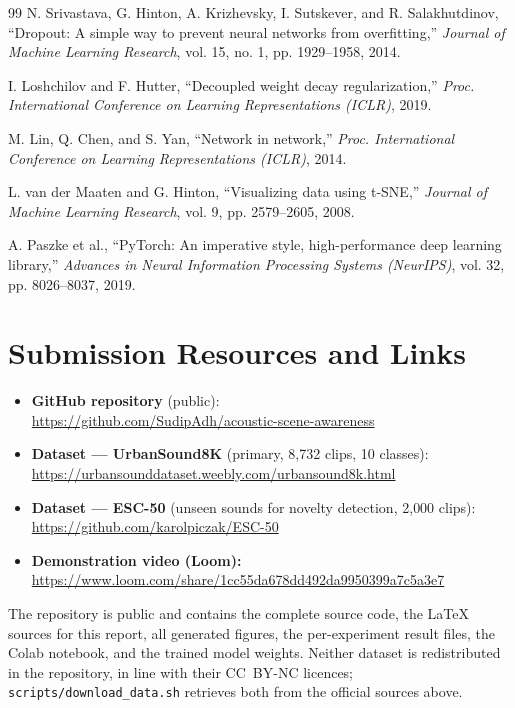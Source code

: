 \documentclass[11pt, a4paper]{article}
\newcommand{\repourl}{https://github.com/SudipAdh/acoustic-scene-awareness}
\newcommand{\youtubeurl}{\url{https://www.loom.com/share/1cc55da678dd492da9950399a7c5a3e7}}
\newcommand{\dsurbanurl}{https://urbansounddataset.weebly.com/urbansound8k.html}
\newcommand{\dsescurl}{https://github.com/karolpiczak/ESC-50}
\begin{document}
\begin{thebibliography}{99}
N. Srivastava, G. Hinton, A. Krizhevsky, I. Sutskever, and R. Salakhutdinov, ``Dropout: A simple way to prevent neural networks from overfitting,'' \emph{Journal of Machine Learning Research}, vol. 15, no. 1, pp. 1929--1958, 2014.

I. Loshchilov and F. Hutter, ``Decoupled weight decay regularization,'' \emph{Proc. International Conference on Learning Representations (ICLR)}, 2019.

M. Lin, Q. Chen, and S. Yan, ``Network in network,'' \emph{Proc. International Conference on Learning Representations (ICLR)}, 2014.

L. van der Maaten and G. Hinton, ``Visualizing data using t-SNE,'' \emph{Journal of Machine Learning Research}, vol. 9, pp. 2579--2605, 2008.

A. Paszke et al., ``PyTorch: An imperative style, high-performance deep learning library,'' \emph{Advances in Neural Information Processing Systems (NeurIPS)}, vol. 32, pp. 8026--8037, 2019.

\end{thebibliography}

\newpage
\appendix

\section{Submission Resources and Links}
\label{app:links}

\begin{itemize}[leftmargin=2.2em]
    \item \textbf{GitHub repository} (public):\\
          \url{\repourl}
    \item \textbf{Dataset --- UrbanSound8K} (primary, 8{,}732 clips, 10 classes):\\
          \url{\dsurbanurl}
    \item \textbf{Dataset --- ESC-50} (unseen sounds for novelty detection, 2{,}000 clips):\\
          \url{\dsescurl}
    \item \textbf{Demonstration video (Loom):}\\
          \youtubeurl
\end{itemize}

The repository is public and contains the complete source code, the LaTeX sources for this report, all generated figures, the per-experiment result files, the Colab notebook, and the trained model weights. Neither dataset is redistributed in the repository, in line with their CC~BY-NC licences; \texttt{scripts/download\_data.sh} retrieves both from the official sources above.
\end{document}
